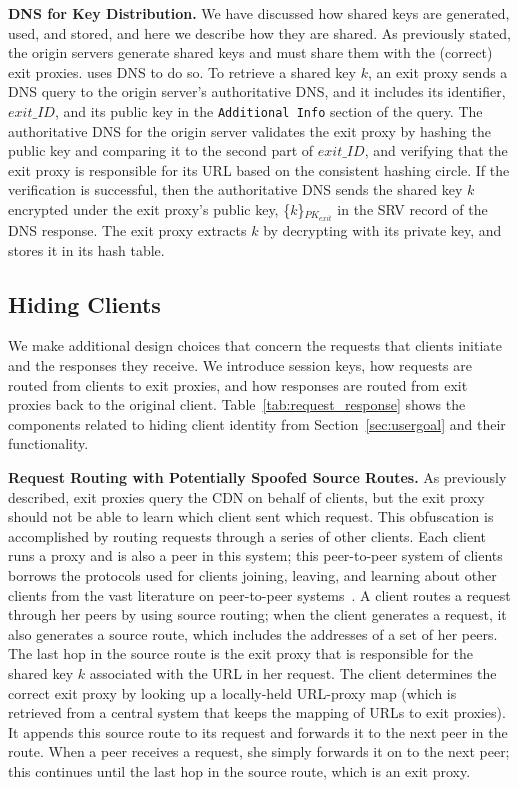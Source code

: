 \textbf{DNS for Key Distribution.}
We have discussed how shared keys are generated, used, and stored, and here we describe how they are shared.  As previously 
stated, the origin servers generate shared keys and must share them with the (correct) exit proxies.  \system{} uses DNS
to do so.  To retrieve a shared key $k$, an exit proxy sends a DNS query to the origin server's authoritative DNS, and 
it includes its identifier, $exit\_ID$, and its public key in the {\tt Additional Info} section of the query.  The 
authoritative DNS for the origin server validates the exit proxy by hashing the public key and comparing it to the 
second part of $exit\_ID$, and verifying that the exit proxy is responsible for its URL based on the consistent 
hashing circle.  If the verification is successful, then the authoritative DNS sends the shared key $k$ encrypted 
under the exit proxy's public key, \{$k$\}$_{PK_{exit}}$ in the SRV record of the DNS response.  The exit proxy 
extracts $k$ by decrypting with its private key, and stores it in its hash table.



\subsection{Hiding Clients}
\label{sec:hiding_clients}
We make additional design choices that concern the requests that clients initiate
and the responses they receive. We 
introduce session keys, how requests are routed from clients to exit proxies, and how responses 
are routed from exit proxies back to the original client. Table~\ref{tab:request_response} shows the 
\system{} components related to hiding client identity from Section~\ref{sec:usergoal} and their functionality.


\textbf{Request Routing with Potentially Spoofed Source Routes.}
As previously described, exit proxies query the CDN on behalf of clients, but the
exit proxy
should not be able to learn which client sent which request.  This obfuscation is
accomplished by routing requests through
a series of other clients.  Each client runs a proxy and is
also a peer in this system; this 
peer-to-peer system of clients borrows the 
protocols used for clients joining, leaving, and learning about other clients from
the vast literature on peer-to-peer systems~\cite{monnerat2006d1ht,risson2006stable,zhu2005efficient,gupta2003kelips,lesniewski2008sybil,leong2004achieving}. A client routes a request through
her peers by using source routing; when the client generates a request, it also
generates a source route, which includes
the addresses of a set of her peers.  The last hop in the source route is the exit proxy that is responsible for the 
shared key $k$ associated with the URL in her request.  The client determines the correct exit proxy by looking up a locally-held URL-proxy map (which is retrieved from a central system that keeps the mapping of URLs to exit proxies).  
It appends this source route to its request and forwards it to the next peer
in the route.  When a peer receives
a request, she simply forwards it on to the next peer; this continues until the last hop in the source route, which 
is an exit proxy. 

